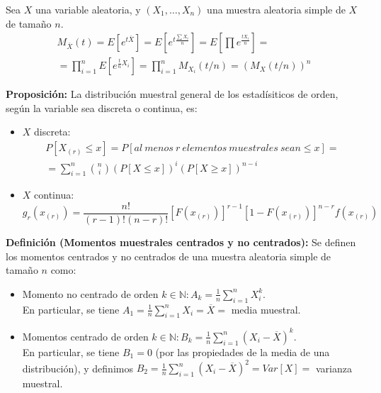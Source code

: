 \documentclass{article}
\begin{document}
Sea $X$ una variable aleatoria, y $(X_1,\ldots,X_n)$ una muestra aleatoria simple de $X$ de tamaño $n$. 
\begin{gather*}
M_{\overline{X}}(t)=E\left[e^{t\overline{X}}\right]=E\left[e^{t\frac{\sum X_i}{n}}\right]=E\left[ \prod e^{\frac{tX_i}{n}}\right]=\\
=\prod_{i=1}^nE\left[e^{\frac{t}{n}X_i}\right]=\prod_{i=1}^nM_{X_i}(t/n)=(M_X(t/n))^n
\end{gather*}

\textbf{Proposición:} La distribución muestral general de los estadísiticos de orden, según la variable sea discreta o continua, es:
\begin{itemize}
\item $X$ discreta:
\begin{gather*}
P\left[X_{(r)}\leq x\right]=P\left[al\:menos\:r\:elementos\:muestrales\:sean\leq x\right]=\\
=\sum_{i=1}^n\binom{n}{i}(P[X\leq x])^i(P[X\geq x])^{n-i}
\end{gather*}

\item $X$ continua:
\begin{equation*}
g_r(x_{(r)})=\frac{n!}{(r-1)!(n-r)!}[F(x_{(r)})]^{r-1}[1-F(x_{(r)})]^{n-r}f(x_{(r)})
\end{equation*}
\end{itemize}

\textbf{Definición (Momentos muestrales centrados y no centrados):} Se definen los momentos centrados y no centrados de una muestra aleatoria simple de tamaño $n$ como:
\begin{itemize}
\item Momento no centrado de orden $k\in\mathbb{N}:A_k=\frac{1}{n}\sum_{i=1}^n X_i^k$.\\

En particular, se tiene $A_1=\frac{1}{n}\sum_{i=1}^n X_i=\overline{X}=$ media muestral.

\item Momentos centrado de orden $k\in \mathbb{N}:B_k=\frac{1}{n}\sum_{i=1}^n(X_i-\overline{X})^k$.\\

En particular, se tiene $B_1=0$ (por las propiedades de la media de una distribución), y definimos $B_2=\frac{1}{n}\sum_{i=1}^n(X_i-\overline{X})^2=Var[X]=$ varianza muestral.
\end{itemize}
\end{document}
